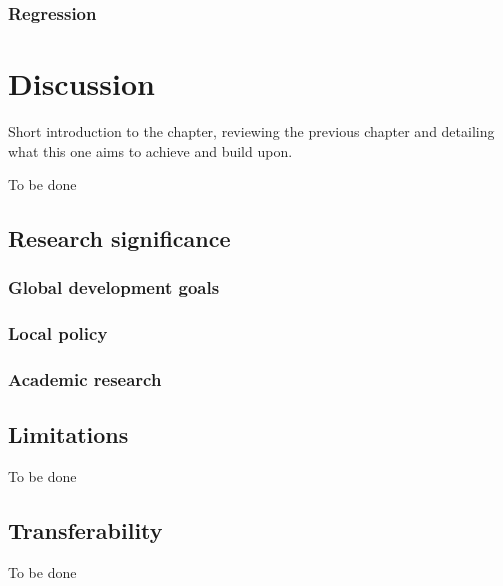 \documentclass[
  12pt,
  oneside]{book}
\begin{document}
\hypertarget{regression}{%
\subsection{Regression}\label{regression}}

\hypertarget{discussion}{%
\chapter{Discussion}\label{discussion}}

Short introduction to the chapter, reviewing the previous chapter and detailing what this one aims to achieve and build upon.

To be done

\hypertarget{research-significance}{%
\section{Research significance}\label{research-significance}}

\hypertarget{global-development-goals}{%
\subsection{Global development goals}\label{global-development-goals}}

\hypertarget{local-policy}{%
\subsection{Local policy}\label{local-policy}}

\hypertarget{academic-research}{%
\subsection{Academic research}\label{academic-research}}

\hypertarget{limitations-1}{%
\section{Limitations}\label{limitations-1}}

To be done

\hypertarget{transferability}{%
\section{Transferability}\label{transferability}}

To be done
\end{document}
